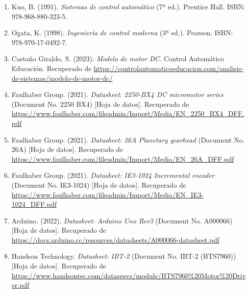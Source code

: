 \begin{enumerate}
	\item Kuo, B. (1991). \textit{Sistemas de control automático} (7ª ed.). Prentice Hall. ISBN: 978-968-880-323-5.
	
	\item Ogata, K. (1998). \textit{Ingeniería de control moderna} (3ª ed.). Pearson. ISBN: 978-970-17-0492-7.
	
	\item Castaño Giraldo, S. (2023). \textit{Modelo de motor DC}. Control Automático Educación.
	Recuperado de \url{https://controlautomaticoeducacion.com/analisis-de-sistemas/modelo-de-motor-dc/}
	
	\item Faulhaber Group. (2021). \textit{Datasheet: 2250-BX4 DC micromotor series} (Document No. 2250 BX4) [Hoja de datos].
	Recuperado de \url{https://www.faulhaber.com/fileadmin/Import/Media/EN_2250_BX4_DFF.pdf}
	
	\item Faulhaber Group. (2021). \textit{Datasheet: 26A Planetary gearhead} (Document No. 26A) [Hoja de datos].
	Recuperado de \url{https://www.faulhaber.com/fileadmin/Import/Media/EN_26A_DFF.pdf}
	
	\item Faulhaber Group. (2021). \textit{Datasheet: IE3-1024 Incremental encoder} (Document No. IE3-1024) [Hoja de datos].
	Recuperado de \url{https://www.faulhaber.com/fileadmin/Import/Media/EN_IE3-1024_DFF.pdf}
	
	\item Arduino. (2022). \textit{Datasheet: Arduino Uno Rev3} (Document No. A000066) [Hoja de datos].
	Recuperado de \url{https://docs.arduino.cc/resources/datasheets/A000066-datasheet.pdf}
	
	\item Handson Technology. \textit{Datasheet: IBT-2} (Document No. IBT-2 (BTS7960)) [Hoja de datos].
	Recuperado de \url{https://www.handsontec.com/dataspecs/module/BTS7960%20Motor%20Driver.pdf}
\end{enumerate}